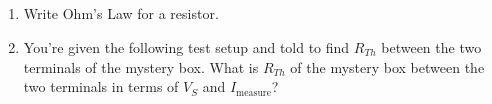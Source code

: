 \\ \\
\\ \\
\begin{enumerate}
    \item{Write Ohm's Law for a resistor.}
    

    \item{You're given the following test setup and told to find $R_{Th}$ between the two terminals of the mystery box. What is $R_{Th}$ of the mystery box between the two terminals in terms of $V_S$ and $I_\text{measure}$?}
    

    

\end{enumerate}
